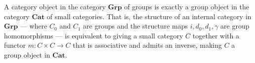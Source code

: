 A category object in the category $\mathbf{Grp}$ of groups is exactly a group object in the category $\mathbf{Cat}$ of small categories. That is, the structure of an internal category in $\mathbf{Grp}$ — where $C_0$ and $C_1$ are groups and the structure maps $i, d_0, d_1, \gamma$ are group homomorphisms — is equivalent to giving a small category $C$ together with a functor $m : C \times C \to C$ that is associative and admits an inverse, making $C$ a group object in $\mathbf{Cat}$.
